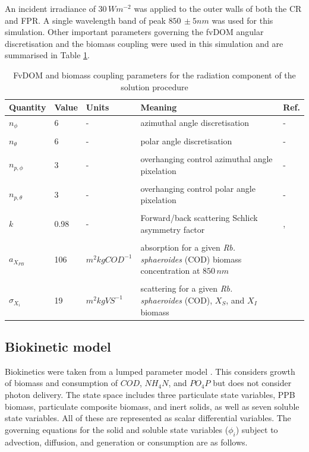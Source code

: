An incident irradiance of $30\, Wm^{-2}$ was applied to the outer walls of both the CR and FPR. A single wavelength band of peak $850\, \pm 5 nm$ was used for this simulation. Other important parameters governing the fvDOM angular discretisation and the biomass coupling were used in this simulation and are summarised in Table \ref{tab:photoBioProperties}.

\begin{table}[tp]
\caption{FvDOM and biomass coupling parameters for the radiation component of the solution procedure}
\centering
\label{tab:photoBioProperties}
\begin{tabular}{p{2.5cm} p{1.2cm}  p{2.3cm} p{4.5cm} p{1.3cm}}

\hline
\textbf{Quantity} & \textbf{Value} & \textbf{Units} & \textbf{Meaning} & \textbf{Ref.}\\ \hline
$n_\phi$ & 6 & - &azimuthal angle discretisation & - \\ \\
$n_\theta$ & 6 & - & polar angle discretisation & - \\ \\
$n_{p,\phi}$& 3 & - & overhanging control azimuthal angle pixelation & - \\ \\
$n_{p,\theta}$& 3 & - & overhanging control polar angle pixelation & -\\ \\
$k$ & 0.98 & - & Forward/back scattering Schlick asymmetry factor & \cite{jarosz2008}, \cite{berberoglu2007a}\\ \\ 
$a_{X_{PB}}$ & 106 & $m^2 kgCOD^{-1}$ & absorption for a given \textit{Rb. sphaeroides} (COD) biomass concentration at $850\, nm$ & \cite{berberoglu2007a}\\ \\
$\sigma_{X_{i}}$ & 19 & $m^2 kgVS^{-1}$ & scattering for a given \textit{Rb. sphaeroides} (COD), $X_S$, and $X_I$ biomass & \cite{berberoglu2007a}\\
\hline
\end{tabular}
\end{table}
\newpage
\subsection{Biokinetic model}
Biokinetics were taken from a lumped parameter model \cite{puyol2017}. This considers growth of biomass and consumption of $COD$, $NH_4N$, and $PO_4P$ but does not consider photon delivery. The state space includes three particulate state variables, PPB biomass, particulate composite biomass, and inert solids, as well as seven soluble state variables. All of these are represented as scalar differential variables. The governing equations for the solid and soluble state variables ($\phi_i$) subject to advection, diffusion, and generation or consumption are as follows.

